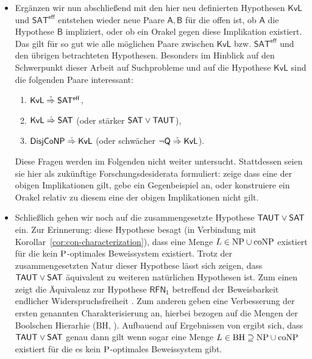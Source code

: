\begin{itemize}[parsep=0pt,listparindent=\parindent,itemsep=5pt plus 1pt minus 1pt,midpenalty=0]
    \item Ergänzen wir nun abschließend mit den hier neu definierten Hypothesen $\mathsf{KvL}$ und $\mathsf{SAT^{eff}}$ entstehen wieder neue Paare $\mathsf{A,B}$ für die offen ist, ob $\mathsf A$ die Hypothese $\mathsf B$ impliziert, oder ob ein Orakel gegen diese Implikation existiert. Das gilt für so gut wie alle möglichen Paare zwischen $\mathsf{KvL}$ bzw. $\mathsf{SAT^{eff}}$ und den übrigen betrachteten Hypothesen. 
        Besonders im Hinblick auf den Schwerpunkt dieser Arbeit auf Suchprobleme und auf die Hypothese $\mathsf{KvL}$ sind die folgenden Paare interessant:
        \begin{enumerate}[noitemsep,resume,label=(\roman*)]
            \item $\mathsf{KvL}\stackrel{\smash{\text{\raisebox{-1pt}{\tiny ?}}}}{\Rightarrow}\mathsf{SAT^{eff}}$,
            \item $\mathsf{KvL}\stackrel{\smash{\text{\raisebox{-1pt}{\tiny ?}}}}{\Rightarrow}\hSAT$ (oder stärker $\hSAT\lor\hTAUT$),
            \item $\hDisjCoNP\stackrel{\smash{\text{\raisebox{-1pt}{\tiny ?}}}}{\Rightarrow}\mathsf{KvL}$ (oder schwächer $\neg\hQ\stackrel{\smash{\text{\raisebox{-1pt}{\tiny ?}}}}{\Rightarrow}\mathsf{KvL}$).
        \end{enumerate}
        Diese Fragen werden im Folgenden nicht weiter untersucht. Stattdessen seien sie hier als zukünftige Forschungsdesiderata formuliert: zeige dass eine der obigen Implikationen gilt, gebe ein Gegenbeispiel an, oder konstruiere ein Orakel relativ zu diesem eine der obigen Implikationen nicht gilt.

    \item Schließlich gehen wir noch auf die zusammengesetzte Hypothese $\hTAUT\lor\hSAT$ ein. Zur Erinnerung: diese Hypothese besagt (in Verbindung mit Korollar~\ref{cor:con-characterization}), dass eine Menge $L\in\NP\cup\coNP$ existiert für die kein $\P$-optimales Beweissystem existiert.
        Trotz der zusammengesetzten Natur dieser Hypothese lässt sich zeigen, dass $\hTAUT\lor\hSAT$ äquivalent zu weiteren natürlichen Hypothesen ist.
        Zum einen zeigt \textcite[Thm.~3.2]{khaniki_new_2022} die Äquivalenz zur Hypothese $\mathsf{RFN_1}$ betreffend der Beweisbarkeit endlicher Widerspruchsfreiheit \parencites(vgl.){pudlak_incompleteness_2017}.
        Zum anderen geben \textcite{egidy_upward_2023} eine Verbesserung der ersten genannten Charakterisierung an, hierbei bezogen auf die Mengen der Boolschen Hierarhie ($\mathrm{BH}$, \cites(vgl.)(){cai_boolean_1986}{cai_boolean_1988}{cai_boolean_1989}). Aufbauend auf Ergebnissen von \textcite{kobler_optimal_2003} ergibt sich, dass $\hTAUT\lor\hSAT$ genau dann gilt wenn sogar eine Menge $L \in \mathrm{BH}\supseteq \NP\cup\coNP$ existiert für die es kein $\P$-optimales Beweissystem gibt.


\end{itemize}
